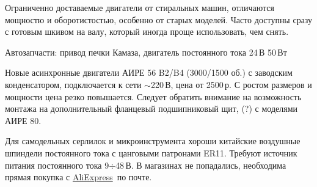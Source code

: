 Ограниченно доставаемые двигатели от стиральных машин, отличаются мощностю и
оборотистостью, особенно от старых моделей. Часто доступны сразу с готовым
шкивом на валу, который иногда проще использовать, чем снять.

Автозапчасти: привод печки Камаза, двигатель постоянного тока
24\,В 50\,Вт

Новые асинхронные двигатели АИРЕ 56 B2/B4 (3000/1500 об.) с заводским
конденсатором, подключается к сети $\sim$220\,В, цена от 2500\,р.
С ростом размеров и мощности цена резко повышается.
Следует обратить внимание на возможность монтажа на дополнительный фланцевый
подшипниковый щит, (?) с моделями АИРЕ 80.

Для самодельных серлилок и микроинструмента хороши китайские воздушные шпиндели
постоянного тока с цанговыми патронами ER11. Требуют источник питания
постоянного тока 9$\div$48\,В. В магазинах не попадались, необходима прямая
покупка с \href{http://www.aliexpress.com/}{AliExpress}\ по почте.

